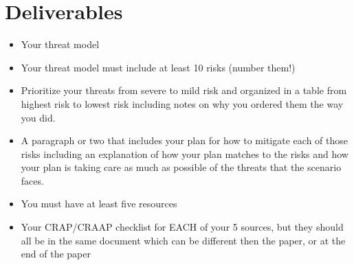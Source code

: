 \documentclass[12pt]{article}
\begin{document}
\section*{Deliverables}
\begin{itemize}
    \item Your threat model 
    \item Your threat model must include at least 10 risks (number them!)
    \item Prioritize your threats from severe to mild risk and organized in a table from highest risk to lowest risk including notes  on why you ordered them the way you did.
    \item A paragraph or two that includes your plan for how to mitigate each of those risks including an explanation of how your plan matches to the risks and how your plan is taking care as much as possible of the threats that the scenario faces.
    \item You must have at least five resources 
    \item Your CRAP/CRAAP checklist for EACH of your 5 sources, but they should all be in the same document which can be different then the paper, or at the end of the paper
\end{itemize}    
\end{document}
